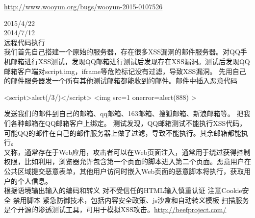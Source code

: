 \documentclass{leptc}
\begin{document}
\begin{center}
\end{center}
\begin{center}
	\url{http://www.wooyun.org/bugs/wooyun-2015-0107526}
\end{center}
 2015/4/22\\
 2014/7/12\\
 远程代码执行 \\
  我们首先自己搭建一个原始的服务器，存在很多XSS漏洞的邮件服务器。对QQ手机邮箱进行XSS测试，发现QQ邮箱进行测试后发现存在XSS漏洞。测试后发现QQ邮箱客户端对script,img，iframe等危险标记没有过滤，导致XSS漏洞。 先用自己的邮件服务器发一个所有其他测试邮箱都能收到的邮件。邮件中插入恶意代码
\begin{verbatimtab}
		<script>alert(/3/)</script>
		<img src=1 onerror=alert(888) >
\end{verbatimtab}
发送我们的邮件到自己的邮箱、qq邮箱、163邮箱、搜狐邮箱、新浪邮箱等。 把我们各种邮箱在QQ邮箱客户上绑定。 测试发现，QQ邮箱测试不能执行XSS代码，可能QQ的邮件在自己的邮件服务器上做了过滤，导致不能执行。其余邮箱都能执行。
\\
 又称，通常存在于Web应用，攻击者可以在Web页面注入，通常用于绕过获得控制权限，比如利用，浏览器允许包含第一个页面的脚本进入第二个页面。恶意用户在公共区域提交恶意表单，其他用户访问时嵌入Web页面的恶意脚本将执行，获取用户的个人信息。\\
  根据语境输出输入的编码和转义
 对不受信任的HTML输入慎重认证
 注意Cookie安全
 禁用脚本
 紧急防御技术，包括内容安全政策、js沙盒和自动转义模板
 扫描服务 \\
 是个开源的渗透测试工具，可用于模拟XSS攻击。\url{http://beefproject.com/}\\
\end{document}
